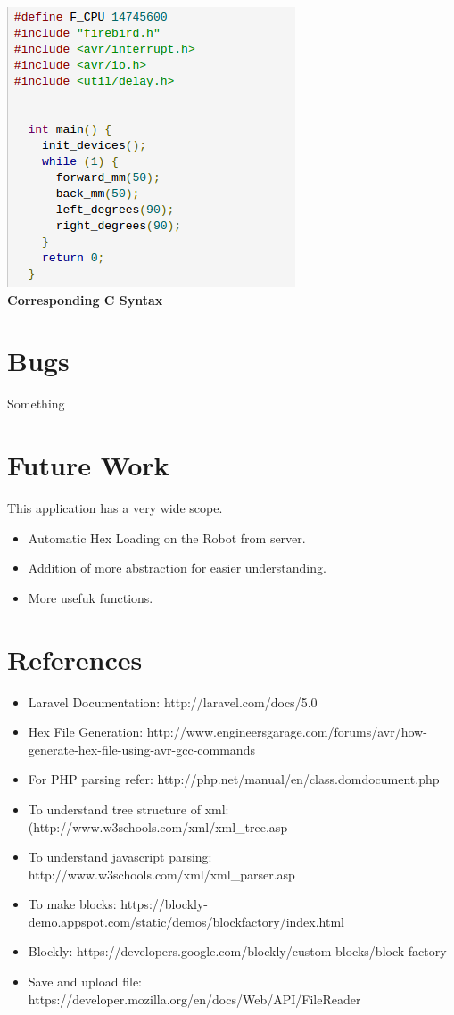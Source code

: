 \documentclass[a4paper,10pt]{report}
\begin{document}
    \begin{center}
    \includegraphics[scale =0.5]{images/firebirdV.png}\\[.1in]
    \textbf{Corresponding C Syntax}
    \end{center}

\chapter{Bugs}
Something
\chapter{Future Work}
  This application has a very wide scope.
  \begin{itemize}
   \item Automatic Hex Loading on the Robot from server.
   \item Addition of more abstraction for easier understanding.
   \item More usefuk functions.
  \end{itemize}

\chapter{References}
\begin{itemize}
 \item Laravel Documentation: http://laravel.com/docs/5.0
 \item Hex File Generation: http://www.engineersgarage.com/forums/avr/how-generate-hex-file-using-avr-gcc-commands
 \item For PHP parsing refer: http://php.net/manual/en/class.domdocument.php
 \item To understand tree structure of xml: (http://www.w3schools.com/xml/xml\_tree.asp
 \item To understand javascript parsing: http://www.w3schools.com/xml/xml\_parser.asp
 \item To make blocks: https://blockly-demo.appspot.com/static/demos/blockfactory/index.html
 \item Blockly: https://developers.google.com/blockly/custom-blocks/block-factory
 \item Save and upload file: https://developer.mozilla.org/en/docs/Web/API/FileReader
\end{itemize}
\end{document}
